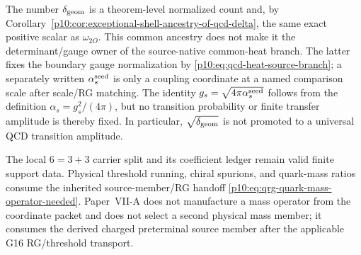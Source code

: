 \documentclass[12pt,a4paper]{article}
\providecommand{\deltageom}{\delta_{\rm geom}}
\providecommand{\alphasseed}{\alpha_s^{\rm seed}}
\begin{document}
\begin{remark}
\label{p10:rem:geometric-defect-versus-strong-seed}
The number \(\deltageom\) is a theorem-level normalized count and, by
Corollary~\ref{p10:cor:exceptional-shell-ancestry-of-qcd-delta}, the same exact
positive scalar as \(\omega_{2O}\).  This common ancestry does not make it the
determinant/gauge owner of the source-native common-heat branch.  The latter
fixes the boundary gauge normalization by \eqref{p10:eq:qcd-heat-source-branch};
a separately written \(\alphasseed\) is only a coupling coordinate at a named
comparison scale after scale/RG matching.  The identity
\(g_s=\sqrt{4\pi\alphasseed}\) follows from the definition
\(\alpha_s=g_s^2/(4\pi)\), but no transition probability or finite transfer
amplitude is thereby fixed.  In particular, \(\sqrt{\deltageom}\) is not
promoted to a universal QCD transition amplitude.
\end{remark}

\begin{remark}
\label{p10:rem:paper-vi-quark-split-versus-p8-spurions}
The local \(6=3+3\) carrier split and its coefficient ledger remain valid finite support data.  Physical threshold running, chiral spurions, and quark-mass ratios consume the inherited source-member/RG handoff \eqref{p10:eq:qrg-quark-mass-operator-needed}.  Paper~VII-A does not manufacture a mass operator from the coordinate packet and does not select a second physical mass member; it consumes the derived charged preterminal source member after the applicable G16 RG/threshold transport.
\end{remark}
\end{document}
